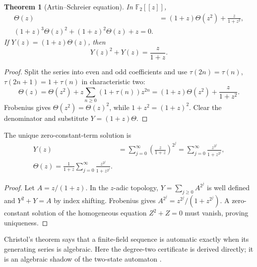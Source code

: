 \documentclass[11pt,oneside]{article}
\numberwithin{equation}{section}
\newtheorem{theorem}{Theorem}[section]
\theoremstyle{definition}
\theoremstyle{remark}
\newcommand{\Ftwo}{\mathbb F_2}
\begin{document}
\begin{theorem}[Artin--Schreier equation]
\label{p1:thm:Artin-Schreier}
In \(\Ftwo[[z]]\),
\begin{align}
  \Theta(z)&=(1+z)\Theta(z^2)+\frac{z}{1+z^2},
  \label{p1:eq:Theta-functional}\\
  \boxed{
  (1+z)^3\Theta(z)^2+(1+z)^2\Theta(z)+z=0.}
  \label{p1:eq:Theta-quadratic}
\end{align}
If \(Y(z)=(1+z)\Theta(z)\), then
\begin{equation}
  \boxed{
  Y(z)^2+Y(z)=\frac{z}{1+z}.}
  \label{p1:eq:Y-Artin-Schreier}
\end{equation}
\end{theorem}

\begin{proof}
Split the series into even and odd coefficients and use
\(\tau(2n)=\tau(n)\), \(\tau(2n+1)=1+\tau(n)\) in characteristic two:
\[
 \Theta(z)=\Theta(z^2)+z\sum_{n\ge0}(1+\tau(n))z^{2n}
 =(1+z)\Theta(z^2)+\frac{z}{1+z^2}.
\]
Frobenius gives \(\Theta(z^2)=\Theta(z)^2\), while
\(1+z^2=(1+z)^2\).  Clear the denominator and substitute
\(Y=(1+z)\Theta\).
\end{proof}

\begin{corollary}
\label{p1:cor:Artin-Schreier-sum}
The unique zero-constant-term solution is
\begin{align}
  Y(z)&=\sum_{j=0}^{\infty}
      \left(\frac{z}{1+z}\right)^{2^j}
      =\sum_{j=0}^{\infty}\frac{z^{2^j}}{1+z^{2^j}},
  \label{p1:eq:Y-explicit}\\
  \boxed{
  \Theta(z)=\frac1{1+z}
      \sum_{j=0}^{\infty}\frac{z^{2^j}}{1+z^{2^j}}.}
  \label{p1:eq:Theta-explicit}
\end{align}
\end{corollary}

\begin{proof}
Let \(A=z/(1+z)\).  In the \(z\)-adic topology,
\(Y=\sum_{j\ge0}A^{2^j}\) is well defined and
\(Y^2+Y=A\) by index shifting.  Frobenius gives
\(A^{2^j}=z^{2^j}/(1+z^{2^j})\).  A zero-constant solution of the homogeneous
equation \(Z^2+Z=0\) must vanish, proving uniqueness.
\end{proof}

Christol's theorem says that a finite-field sequence is automatic exactly when
its generating series is algebraic.  Here the degree-two certificate is
derived directly; it is an algebraic shadow of the two-state automaton
\cite{p1:christol1980}.
\end{document}
